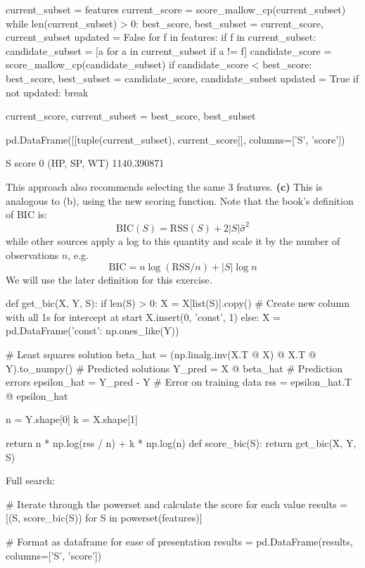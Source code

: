 \begin{python}
current_subset = features
current_score = score_mallow_cp(current_subset)
while len(current_subset) > 0:
    best_score, best_subset = current_score, current_subset
    updated = False
    for f in features:
        if f in current_subset:
            candidate_subset = [a for a in current_subset if a != f]
            candidate_score = score_mallow_cp(candidate_subset)
            if candidate_score < best_score:
                best_score, best_subset = candidate_score, candidate_subset
                updated = True              
    if not updated:
        break
        
    current_score, current_subset = best_score, best_subset
    
pd.DataFrame([[tuple(current_subset), current_score]], columns=['S', 'score'])
\end{python}
\begin{console}
              S        score
0  (HP, SP, WT)  1140.390871
\end{console}
This approach also recommends selecting the same 3 features.
\textbf{(c)} This is analogous to (b), using the new scoring function.
Note that the book's definition of BIC is:
\[
\text{BIC}(S) = \text{RSS}(S) + 2 |S| \hat{\sigma}^{2}
\]
while other sources apply a log to this quantity and scale it by the
number of observations \(n\), e.g.
\[
\text{BIC} = n \log \left( \text{RSS} / n \right) + |S| \log n
\]
We will use the later definition for this exercise.

\begin{python}
def get_bic(X, Y, S):
    if len(S) > 0:
        X = X[list(S)].copy()
        # Create new column with all 1s for intercept at start
        X.insert(0, 'const', 1)
    else:
        X = pd.DataFrame({'const': np.ones_like(Y)})
    
    # Least squares solution
    beta_hat = (np.linalg.inv(X.T @ X) @ X.T @ Y).to_numpy()
    # Predicted solutions
    Y_pred = X @ beta_hat
    # Prediction errors
    epsilon_hat = Y_pred - Y
    # Error on training data
    rss = epsilon_hat.T @ epsilon_hat
    
    n = Y.shape[0]
    k = X.shape[1]
    
    return n * np.log(rss / n) + k * np.log(n)
def score_bic(S):
    return get_bic(X, Y, S)
\end{python}
Full search:

\begin{python}
# Iterate through the powerset and calculate the score for each value
results = [(S, score_bic(S)) for S in powerset(features)]
    
# Format as dataframe for ease of presentation
results = pd.DataFrame(results, columns=['S', 'score'])
\end{python}

